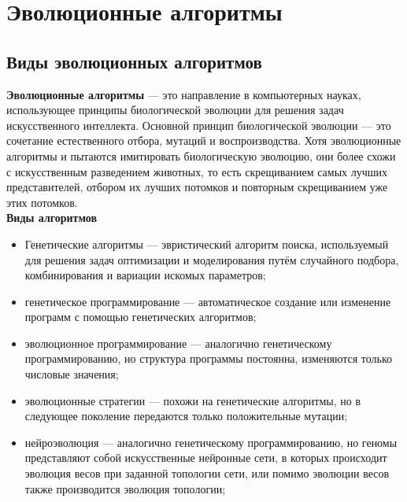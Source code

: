 \newpage

\chapter{Эволюционные алгоритмы}
\section{Виды эволюционных алгоритмов}

\indent \indent \textbf{Эволюционные алгоритмы} — это направление в компьютерных науках, использующее принципы биологической эволюции для решения задач искусственного интеллекта. Основной принцип биологической эволюции — это сочетание естественного отбора, мутаций и воспроизводства. Хотя эволюционные алгоритмы и пытаются имитировать биологическую эволюцию, они более схожи с искусственным разведением животных, то есть скрещиванием самых лучших представителей, отбором их лучших потомков и повторным скрещиванием уже этих потомков. \\

\textbf{Виды алгоритмов}

\begin{itemize}
  \item Генетические алгоритмы — эвристический алгоритм поиска, используемый для решения задач оптимизации и моделирования путём случайного подбора, комбинирования и вариации искомых параметров;
  \item генетическое программирование — автоматическое создание или изменение программ с помощью генетических алгоритмов;
  \item эволюционное программирование — аналогично генетическому программированию, но структура программы постоянна, изменяются только числовые значения;
  \item эволюционные стратегии — похожи на генетические алгоритмы, но в следующее поколение передаются только положительные мутации;
  \item нейроэволюция — аналогично генетическому программированию, но геномы представляют собой искусственные нейронные сети, в которых происходит эволюция весов при заданной топологии сети, или помимо эволюции весов также производится эволюция топологии;
\end{itemize}
